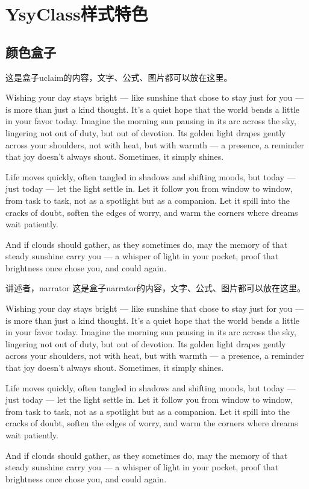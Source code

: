 
\section{YsyClass样式特色}

\subsection{颜色盒子}

\begin{uclaim}
	这是盒子uclaim的内容，文字、公式、图片都可以放在这里。
	
	Wishing your day stays bright — like sunshine that chose to stay just for you — is more than just a kind thought. It’s a quiet hope that the world bends a little in your favor today. Imagine the morning sun pausing in its arc across the sky, lingering not out of duty, but out of devotion. Its golden light drapes gently across your shoulders, not with heat, but with warmth — a presence, a reminder that joy doesn’t always shout. Sometimes, it simply shines.
	
	Life moves quickly, often tangled in shadows and shifting moods, but today — just today — let the light settle in. Let it follow you from window to window, from task to task, not as a spotlight but as a companion. Let it spill into the cracks of doubt, soften the edges of worry, and warm the corners where dreams wait patiently.
	
	And if clouds should gather, as they sometimes do, may the memory of that steady sunshine carry you — a whisper of light in your pocket, proof that brightness once chose you, and could again.
\end{uclaim}

\begin{narrator}{讲述者，narrator}
	这是盒子narrator的内容，文字、公式、图片都可以放在这里。
	
	Wishing your day stays bright — like sunshine that chose to stay just for you — is more than just a kind thought. It’s a quiet hope that the world bends a little in your favor today. Imagine the morning sun pausing in its arc across the sky, lingering not out of duty, but out of devotion. Its golden light drapes gently across your shoulders, not with heat, but with warmth — a presence, a reminder that joy doesn’t always shout. Sometimes, it simply shines.
	
	Life moves quickly, often tangled in shadows and shifting moods, but today — just today — let the light settle in. Let it follow you from window to window, from task to task, not as a spotlight but as a companion. Let it spill into the cracks of doubt, soften the edges of worry, and warm the corners where dreams wait patiently.
	
	And if clouds should gather, as they sometimes do, may the memory of that steady sunshine carry you — a whisper of light in your pocket, proof that brightness once chose you, and could again.
\end{narrator}

